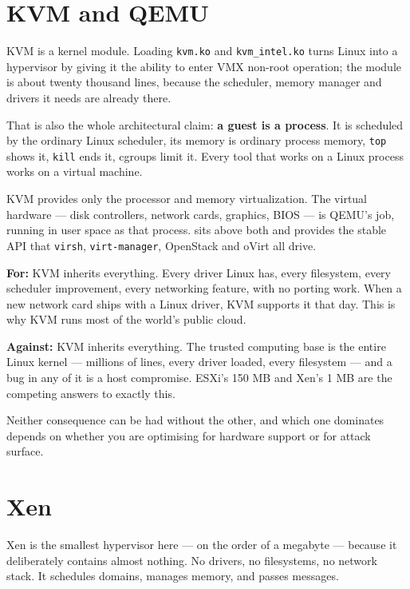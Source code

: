\section{KVM and QEMU}

KVM is a kernel module. Loading \texttt{kvm.ko} and \texttt{kvm\_intel.ko} turns
Linux into a hypervisor by giving it the ability to enter VMX non-root
operation; the module is about twenty thousand lines, because the scheduler,
memory manager and drivers it needs are already there.

That is also the whole architectural claim: \textbf{a guest is a process}. It
is scheduled by the ordinary Linux scheduler, its memory is ordinary process
memory, \texttt{top} shows it, \texttt{kill} ends it, cgroups limit it. Every
tool that works on a Linux process works on a virtual machine.

KVM provides only the processor and memory virtualization. The virtual
hardware --- disk controllers, network cards, graphics, BIOS --- is QEMU's job,
running in user space as that process.  sits above both and
provides the stable API that \texttt{virsh}, \texttt{virt-manager}, OpenStack
and oVirt all drive.

\begin{conceptbox}
\textbf{For:} KVM inherits everything. Every driver Linux has, every filesystem,
every scheduler improvement, every networking feature, with no porting work.
When a new network card ships with a Linux driver, KVM supports it that day.
This is why KVM runs most of the world's public cloud.

\smallskip
\textbf{Against:} KVM inherits everything. The trusted computing base is the
entire Linux kernel --- millions of lines, every driver loaded, every
filesystem --- and a bug in any of it is a host compromise. ESXi's 150 MB and
Xen's 1 MB are the competing answers to exactly this.

\smallskip
Neither consequence can be had without the other, and which one dominates
depends on whether you are optimising for hardware support or for attack
surface.
\end{conceptbox}

\section{Xen}

Xen is the smallest hypervisor here --- on the order of a megabyte --- because
it deliberately contains almost nothing. No drivers, no filesystems, no network
stack. It schedules domains, manages memory, and passes messages.

